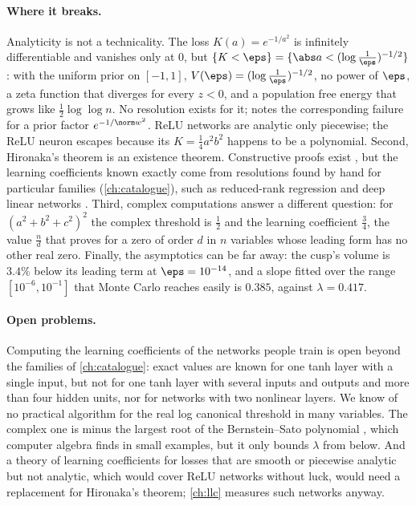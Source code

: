\begin{refsection}
\paragraph{Where it breaks.} Analyticity is not a technicality. The loss $K(a)=e^{-1/a^2}$ is infinitely differentiable and vanishes only at $0$, but $\{K<\eps\}=\{\abs a<(\log\frac1\eps)^{-1/2}\}$: with the uniform prior on $[-1,1]$, $V(\eps)=(\log\frac1\eps)^{-1/2}$, no power of $\eps$, a zeta function that diverges for every $z<0$, and a population free energy that grows like $\frac12\log\log n$. No resolution exists for it; \textcite{Watanabe2010a} notes the corresponding failure for a prior factor $e^{-1/\norm w^2}$. ReLU networks are analytic only piecewise; the ReLU neuron escapes because its $K=\frac14a^2b^2$ happens to be a polynomial. Second, Hironaka's theorem is an existence theorem. Constructive proofs exist \parencite{Villamayor1989,BierstoneMilman1997}, but the learning coefficients known exactly come from resolutions found by hand for particular families (\cref{ch:catalogue}), such as reduced-rank regression \parencite{AoyagiWatanabe2005} and deep linear networks \parencite{Aoyagi2024}. Third, complex computations answer a different question: for $(a^2+b^2+c^2)^2$ the complex threshold is $\frac12$ and the learning coefficient $\frac34$, the value $\frac nd$ that \textcite[Proposition~3.3]{Saito2007} proves for a zero of order $d$ in $n$ variables whose leading form has no other real zero. Finally, the asymptotics can be far away: the cusp's volume is $3.4\%$ below its leading term at $\eps=10^{-14}$, and a slope fitted over the range $[10^{-6},10^{-1}]$ that Monte Carlo reaches easily is $0.385$, against $\lambda=0.417$.

\paragraph{Open problems.} Computing the learning coefficients of the networks people train is open beyond the families of \cref{ch:catalogue}: exact values are known for one tanh layer with a single input, but not for one tanh layer with several inputs and outputs and more than four hidden units, nor for networks with two nonlinear layers. We know of no practical algorithm for the real log canonical threshold in many variables. The complex one is minus the largest root of the Bernstein--Sato polynomial \parencite{Kollar1997}, which computer algebra finds in small examples, but it only bounds $\lambda$ from below. And a theory of learning coefficients for losses that are smooth or piecewise analytic but not analytic, which would cover ReLU networks without luck, would need a replacement for Hironaka's theorem; \cref{ch:llc} measures such networks anyway.


\end{refsection}
